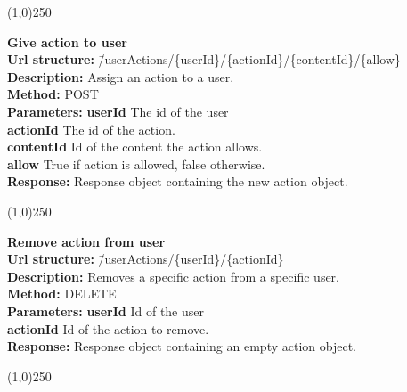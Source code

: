 \documentclass[11pt]{article}
\begin{document}
\begin{center}\line(1,0){250}\end{center}

\begin{tabbing}
\textbf{Give action to user} \\
\textcolor{black!60}{\textbf{Url structure:}} \hspace{0.2in} \= /userActions/\{userId\}/\{actionId\}/\{contentId\}/\{allow\} \\
\textcolor{black!60}{\textbf{Description:}}  \> Assign an action to a user. \\
\textcolor{black!60}{\textbf{Method:}} \> POST \\
\textcolor{black!60}{\textbf{Parameters:}} \> \textbf{userId} The id of the user \\
\> \textbf{actionId} The id of the action. \\
\> \textbf{contentId} Id of the content the action allows. \\
\> \textbf{allow} True if action is allowed, false otherwise. \\
\textcolor{black!60}{\textbf{Response:}} \> Response object containing the new action object.
\end{tabbing}

\begin{center}\line(1,0){250}\end{center}

\begin{tabbing}
\textbf{Remove action from user} \\
\textcolor{black!60}{\textbf{Url structure:}} \hspace{0.2in} \= /userActions/\{userId\}/\{actionId\} \\
\textcolor{black!60}{\textbf{Description:}}  \> Removes a specific action from a specific user. \\
\textcolor{black!60}{\textbf{Method:}} \> DELETE \\
\textcolor{black!60}{\textbf{Parameters:}} \> \textbf{userId} Id of the user \\
\> \textbf{actionId} Id of the action to remove. \\
\textcolor{black!60}{\textbf{Response:}} \> Response object containing an empty action object.
\end{tabbing}

\begin{center}\line(1,0){250}\end{center}
\end{document}
